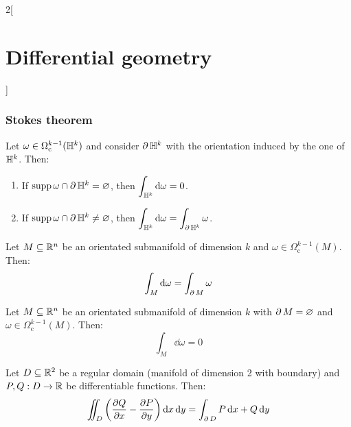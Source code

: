 \documentclass[../../../main.tex]{subfiles}
\begin{document}
\begin{multicols}{2}[\section{Differential geometry}]
  \subsubsection{Stokes theorem}
  \begin{proposition}
    Let $\omega\in\Omega_\text{c}^{k-1}(\mathbb{H}^k)$ and consider $\operatorname{\partial}{\mathbb{H}^k}$ with the orientation induced by the one of $\mathbb{H}^k$. Then:
    \begin{enumerate}
      \item If $\operatorname{supp}{\omega}\cap \operatorname{\partial}{\mathbb{H}^k}=\varnothing$, then $\displaystyle\int_{\mathbb{H}^k}\dd{\omega}=0$.
      \item If $\operatorname{supp}{\omega}\cap \operatorname{\partial}{\mathbb{H}^k}\ne\varnothing$, then $\displaystyle\int_{\mathbb{H}^k}\dd{\omega}=\int_{\operatorname{\partial}{\mathbb{H}^k}}\omega$.
    \end{enumerate}
  \end{proposition}
  \begin{theorem}
    Let $M\subseteq\mathbb{R}^n$ be an orientated submanifold of dimension $k$ and $\omega\in\Omega_\text{c}^{k-1}(M)$. Then: $$\int_M\dd{\omega}=\int_{\operatorname{\partial}{M}}\omega$$
  \end{theorem}
  \begin{corollary}
    Let $M\subseteq\mathbb{R}^n$ be an orientated submanifold of dimension $k$ with $\operatorname{\partial}{M}=\varnothing$ and $\omega\in\Omega_\text{c}^{k-1}(M)$. Then: $$\int_M\dd{\omega}=0$$
  \end{corollary}
  \begin{corollary}
    Let $D\subseteq\mathbb{R}^2$ be a regular domain (manifold of dimension 2 with boundary) and $P,Q:D\rightarrow\mathbb{R}$ be differentiable functions. Then: $$\iint_D\left(\pdv{Q}{x}-\pdv{P}{y}\right)\dd{x}\dd{y}=\int_{\operatorname{\partial}{D}}P\dd{x}+Q\dd{y}$$
  \end{corollary}

\end{multicols}
\end{document}

